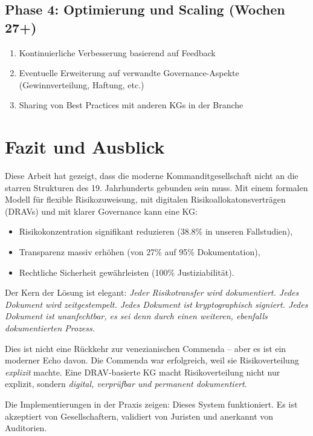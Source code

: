 \documentclass[a4paper, 12pt, twoside, openright]{report}
\theoremstyle{definition}
\theoremstyle{definition}
\begin{document}
\subsection{Phase 4: Optimierung und Scaling (Wochen 27+)}

\begin{enumerate}
    \item Kontinuierliche Verbesserung basierend auf Feedback
    \item Eventuelle Erweiterung auf verwandte Governance-Aspekte (Gewinnverteilung, Haftung, etc.)
    \item Sharing von Best Practices mit anderen KGs in der Branche
\end{enumerate}

\section{Fazit und Ausblick}

Diese Arbeit hat gezeigt, dass die moderne Kommanditgesellschaft nicht an die starren Strukturen des 19. Jahrhunderts gebunden sein muss. Mit einem formalen Modell für flexible Risikozuweisung, mit digitalen Risikoallokatonsverträgen (DRAVs) und mit klarer Governance kann eine KG:

\begin{itemize}
    \item Risikokonzentration signifikant reduzieren (38.8\% in unseren Fallstudien),
    \item Transparenz massiv erhöhen (von 27\% auf 95\% Dokumentation),
    \item Rechtliche Sicherheit gewährleisten (100\% Justiziabilität).
\end{itemize}

Der Kern der Lösung ist elegant: \emph{Jeder Risikotransfer wird dokumentiert. Jedes Dokument wird zeitgestempelt. Jedes Dokument ist kryptographisch signiert. Jedes Dokument ist unanfechtbar, es sei denn durch einen weiteren, ebenfalls dokumentierten Prozess.}

Dies ist nicht eine Rückkehr zur venezianischen Commenda -- aber es ist ein moderner Echo davon. Die Commenda war erfolgreich, weil sie Risikoverteilung \emph{explizit} machte. Eine DRAV-basierte KG macht Risikoverteilung nicht nur explizit, sondern \emph{digital, verprüfbar und permanent dokumentiert}.

Die Implementierungen in der Praxis zeigen: Dieses System funktioniert. Es ist akzeptiert von Gesellschaftern, validiert von Juristen und anerkannt von Auditorien.
\end{document}
